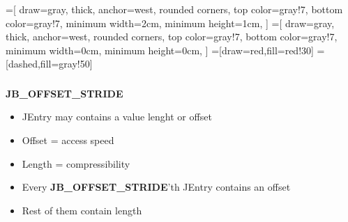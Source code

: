 \documentclass[usenames,dvipsnames, 18pt, compress, aspectratio=169]{beamer}
\begin{document}
\fontsize{14pt}{16}\selectfont
\begin{frame}
    \frametitle{}
    \begin{center}
    =[
        draw=gray,
        thick,
        anchor=west,
        rounded corners,
        top color=gray!7,
        bottom color=gray!7,
        minimum width=2cm,
        minimum height=1cm,
    ]
    =[
        draw=gray,
        thick,
        anchor=west,
        rounded corners,
        top color=gray!7,
        bottom color=gray!7,
        minimum width=0cm,
        minimum height=0cm,
    ]
    =[draw=red,fill=red!30]
    =[dashed,fill=gray!50]

    \end{center}
\end{frame}

\begin{frame}
    \frametitle{}
    \begin{center}
    \textbf{JB\_OFFSET\_STRIDE}

    \begin{itemize}[label={\MVRightarrow}]
        \item JEntry may contains a value lenght or offset
        \item Offset = access speed
        \item Length = compressibility
        \item Every \textbf{JB\_OFFSET\_STRIDE}'th JEntry contains an offset
        \item Rest of them contain length
    \end{itemize}
    \end{center}
\end{frame}

\end{document}
